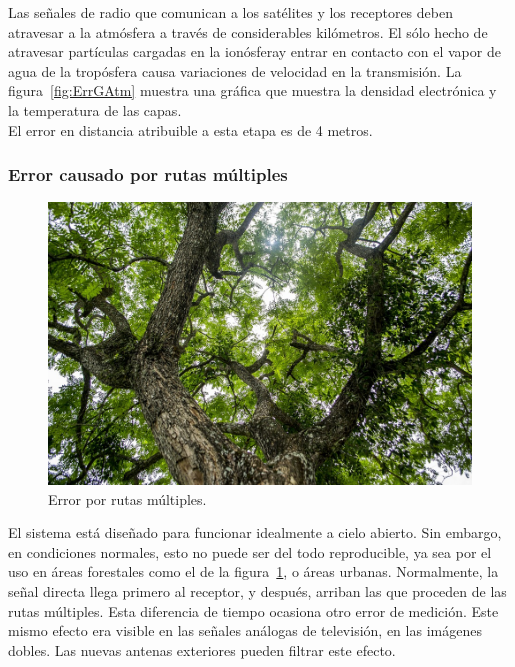 Las señales de radio que comunican a los satélites y los receptores deben atravesar a la atmósfera a través de considerables kilómetros. El sólo hecho de atravesar partículas cargadas en la ionósfera\footnotemark y entrar en contacto con el vapor de agua de la tropósfera causa variaciones de velocidad en la transmisión. La figura~\ref{fig:ErrGAtm} muestra una gráfica que muestra la densidad electrónica y la temperatura de las capas. \\

El error en distancia atribuible a esta etapa es de 4 metros. 


\subsubsection{Error causado por rutas múltiples}

\begin{figure}[H]
\centering
\includegraphics[scale=0.4]{Figures/RutasMult2}
\caption[Error por rutas múltiples.]{Error por rutas múltiples\footnotemark.}
\label{fig:ErrRMul}
\end{figure}


 El sistema está diseñado para funcionar idealmente a cielo abierto. Sin embargo, en condiciones normales, esto no puede ser del todo reproducible, ya sea por el uso en áreas forestales como el de la figura~\ref{fig:ErrRMul}, o áreas urbanas. Normalmente, la señal directa llega primero al receptor, y después, arriban las que proceden de las rutas múltiples. Esta diferencia de tiempo ocasiona otro error de medición. Este mismo efecto era visible en las señales análogas de televisión, en las imágenes dobles. Las nuevas antenas exteriores pueden filtrar este efecto.

